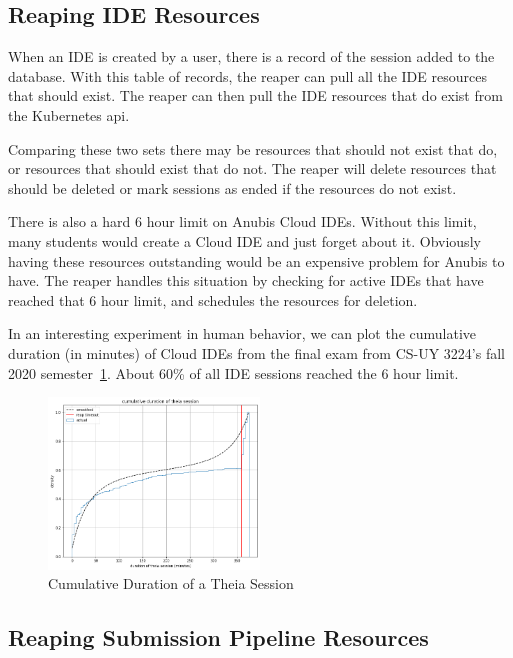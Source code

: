 \subsection{Reaping IDE Resources}\label{subsec:reaping-ide-resources}

When an IDE is created by a user, there is a record of the session added to the database.
With this table of records, the reaper can pull all the IDE resources that should exist.
The reaper can then pull the IDE resources that do exist from the Kubernetes api.

Comparing these two sets there may be resources that should not exist that do, or
resources that should exist that do not.
The reaper will delete resources that should be deleted or mark sessions as ended
if the resources do not exist.

There is also a hard 6 hour limit on Anubis Cloud IDEs.
Without this limit, many students would create a Cloud IDE and just forget about it.
Obviously having these resources outstanding would be an expensive problem for Anubis to have.
The reaper handles this situation by checking for active IDEs that have reached that 6 hour limit,
and schedules the resources for deletion.

In an interesting experiment in human behavior, we can plot the cumulative duration (in minutes) of
Cloud IDEs from the final exam from CS-UY 3224's fall 2020 semester~\ref{fig:theia3}.
About 60\% of all IDE sessions reached the 6 hour limit.

\begin{figure}[ht]
    \centering
    \includegraphics[width=0.5\textwidth]{figures/theia3}
    \caption{Cumulative Duration of a Theia Session\label{fig:theia3}}
\end{figure}

\subsection{Reaping Submission Pipeline Resources}\label{subsec:reaping-submission-pipeline-resources}

